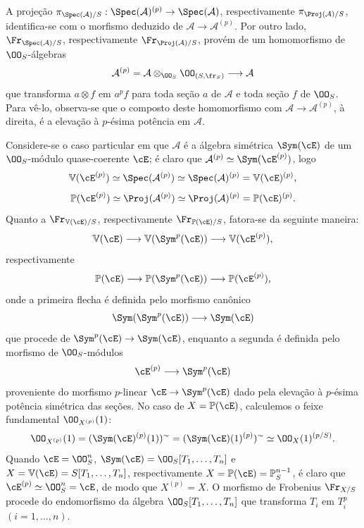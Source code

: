 A projeção $\pi_{\Spec(\mathcal{A})/S}:\Spec(\mathcal{A})^{(p)}\to\Spec(\mathcal{A})$, respectivamente $\pi_{\Proj(\mathcal{A})/S}$, identifica-se com o morfismo deduzido de $\mathcal{A}\to\mathcal{A}^{(p)}$. Por outro lado, $\Fr_{\Spec(\mathcal{A})/S}$, respectivamente $\Fr_{\Proj(\mathcal{A})/S}$, provém de um homomorfismo de $\OO_S$-álgebras
\[
\mathcal{A}^{(p)}=\mathcal{A}\otimes_{\OO_S}\OO_{(S,\fr_S)}\longrightarrow \mathcal{A}
\]
que transforma $a\otimes f$ em $a^p f$ para toda seção $a$ de $\mathcal{A}$ e toda seção $f$ de $\OO_S$. Para vê-lo, observa-se que o composto deste homomorfismo com $\mathcal{A}\to\mathcal{A}^{(p)}$, à direita, é a elevação à $p$-ésima potência em $\mathcal{A}$.

Considere-se o caso particular em que $\mathcal{A}$ é a álgebra simétrica $\Sym(\cE)$ de um $\OO_S$-módulo quase-coerente $\cE$; é claro que $\mathcal{A}^{(p)}\simeq\Sym(\cE^{(p)})$, logo
\[
\mathbb V(\cE^{(p)})\simeq\Spec(\mathcal{A}^{(p)})\simeq\Spec(\mathcal{A})^{(p)}=\mathbb V(\cE)^{(p)},
\]
\[
\mathbb P(\cE^{(p)})\simeq\Proj(\mathcal{A}^{(p)})\simeq\Proj(\mathcal{A})^{(p)}=\mathbb P(\cE)^{(p)}.
\]
Quanto a $\Fr_{\mathbb V(\cE)/S}$, respectivamente $\Fr_{\mathbb P(\cE)/S}$, fatora-se da seguinte maneira:
\[
\mathbb V(\cE)\longrightarrow \mathbb V(\Sym^p(\cE))\longrightarrow \mathbb V(\cE^{(p)}),
\]
respectivamente
\[
\mathbb P(\cE)\longrightarrow \mathbb P(\Sym^p(\cE))\longrightarrow \mathbb P(\cE^{(p)}),
\]
onde a primeira flecha é definida pelo morfismo canônico
\[
\Sym(\Sym^p(\cE))\longrightarrow \Sym(\cE)
\]
que procede de $\Sym^p(\cE)\to\Sym(\cE)$, enquanto a segunda é definida pelo morfismo de $\OO_S$-módulos
\[
\cE^{(p)}\longrightarrow \Sym^p(\cE)
\]
proveniente do morfismo $p$-linear $\cE\to\Sym^p(\cE)$ dado pela elevação à $p$-ésima potência simétrica das seções. No caso de $X=\mathbb P(\cE)$, calculemos o feixe fundamental $\OO_{X^{(p)}}(1)$:
\[
\OO_{X^{(p)}}(1)=(\Sym(\cE)^{(p)}(1))^{\sim}
=(\Sym(\cE)(1)^{(p)})^{\sim}
\simeq \OO_X(1)^{(p/S)}.
\]
Quando $\cE=\OO_S^n$, $\Sym(\cE)=\OO_S[T_1,\ldots,T_n]$ e $X=\mathbb V(\cE)=S[T_1,\ldots,T_n]$, respectivamente $X=\mathbb P(\cE)=\mathbb P_S^{n-1}$, é claro que $\cE^{(p)}\simeq\OO_S^n=\cE$, de modo que $X^{(p)}=X$. O morfismo de Frobenius $\Fr_{X/S}$ procede do endomorfismo da álgebra $\OO_S[T_1,\ldots,T_n]$ que transforma $T_i$ em $T_i^p$ $(i=1,\ldots,n)$.

